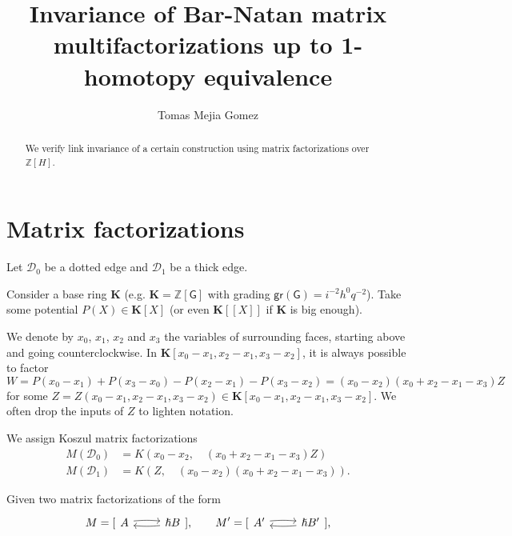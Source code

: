 \documentclass{article}
\title{Invariance of Bar-Natan matrix multifactorizations up to 1-homotopy equivalence}
\author{Tomas Mejia Gomez}
\newcommand{\Z}{\mathbb{Z}}
\newcommand{\DD}{\mathcal{D}}
\newcommand{\gr}{\mathsf{gr}}
\newcommand{\KK}{\mathbf{K}}
\newcommand{\G}{\mathsf{G}}
\newcommand{\mfshort}[4]{%
  \begin{tikzcd}[ampersand replacement=\&]
    {#1} \arrow[r, "#3", bend left=5,start anchor=east, end anchor=west, shift left=2pt]  \& 
    {#2} \arrow[l,"#4", bend left=5, start anchor=west, end anchor=east, shift left=2pt]
  \end{tikzcd}%
}
\theoremstyle{plain} %
\theoremstyle{definition} %
\theoremstyle{remark} %
\begin{document}
\maketitle

\begin{abstract}
We verify link invariance of a certain construction using matrix factorizations over $\Z[H]$.

\end{abstract}



\section{Matrix factorizations}

Let $\DD_0$ be a dotted edge and $\DD_1$ be a thick edge. 

Consider a base ring $\KK$ (e.g. $\KK=\Z[\G]$ with grading
$\gr(\G)=i^{-2}h^0q^{-2}$). Take some potential
$P(X)\in \KK[X]$ (or even $\KK [\![X]\!]$ if $\KK$ is big enough). 

We denote by $x_0$, $x_1$, $x_2$ and $x_3$ the variables of surrounding faces, starting above and going counterclockwise. In $\KK[x_0-x_1,x_2-x_1,x_3-x_2]$, it is always possible to factor
$$W=P(x_0-x_1)+P(x_3-x_0)-P(x_2-x_1)-P(x_3-x_2)= (x_0-x_2)(x_0+x_2-x_1-x_3)Z$$
for some $Z=Z(x_0-x_1,x_2-x_1,x_3-x_2)\in \KK[x_0-x_1,x_2-x_1,x_3-x_2]$. We often drop the inputs of $Z$ to lighten notation.


We assign Koszul matrix factorizations
\begin{align*}
    M(\DD_0)&=K(x_0-x_2,\quad (x_0+x_2-x_1-x_3)Z)\\
    M(\DD_1)&=K(Z,\quad (x_0-x_2)(x_0+x_2-x_1-x_3)).
\end{align*}

Given two matrix factorizations of the form
$$
M=[\mfshort{  A}{\hslash B}{}{}]
,\qquad 
M'=[\mfshort{A'}{\hslash  B'}{}{}]
,
$$
\end{document}
